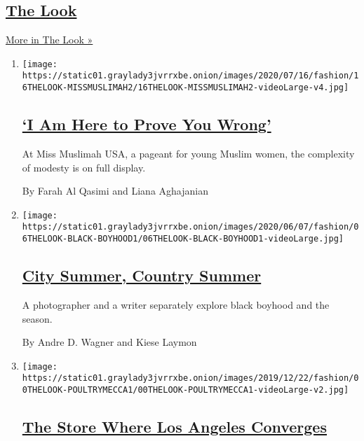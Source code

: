 \hypertarget{the-look}{%
\subsection{\texorpdfstring{\href{/column/the-look}{The
Look}}{The Look}}\label{the-look}}

\href{/column/the-look}{More in The Look »}

\begin{enumerate}
\def\labelenumi{\arabic{enumi}.}
\item
  \texttt{[image: https://static01.graylady3jvrrxbe.onion/images/2020/07/16/fashion/16THELOOK-MISSMUSLIMAH2/16THELOOK-MISSMUSLIMAH2-videoLarge-v4.jpg]}

  \hypertarget{i-am-here-to-prove-you-wrong}{%
  \subsection{\texorpdfstring{\href{/2020/07/04/style/muslim-beauty-pageant-miss-muslimah-usa.html}{`I
  Am Here to Prove You
  Wrong'}}{`I Am Here to Prove You Wrong'}}\label{i-am-here-to-prove-you-wrong}}

  At Miss Muslimah USA, a pageant for young Muslim women, the complexity
  of modesty is on full display.

  By Farah Al Qasimi and Liana Aghajanian
\item
  \texttt{[image: https://static01.graylady3jvrrxbe.onion/images/2020/06/07/fashion/06THELOOK-BLACK-BOYHOOD1/06THELOOK-BLACK-BOYHOOD1-videoLarge.jpg]}

  \hypertarget{city-summer-country-summer}{%
  \subsection{\texorpdfstring{\href{/2020/06/06/style/city-summer-country-summer.html}{City
  Summer, Country
  Summer}}{City Summer, Country Summer}}\label{city-summer-country-summer}}

  A photographer and a writer separately explore black boyhood and the
  season.

  By Andre D. Wagner and Kiese Laymon
\item
  \texttt{[image: https://static01.graylady3jvrrxbe.onion/images/2019/12/22/fashion/00THELOOK-POULTRYMECCA1/00THELOOK-POULTRYMECCA1-videoLarge-v2.jpg]}

  \hypertarget{the-store-where-los-angeles-converges}{%
  \subsection{\texorpdfstring{\href{/2019/12/21/style/la-fresh-poultry-immigrant-family-recipes.html}{The
  Store Where Los Angeles
  Converges}}{The Store Where Los Angeles Converges}}\label{the-store-where-los-angeles-converges}}


\end{enumerate}
